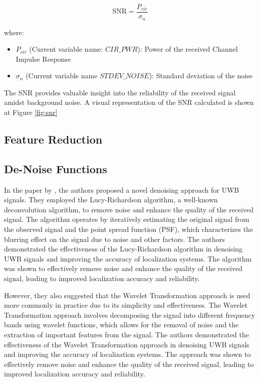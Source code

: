 \begin{equation}
  \text{SNR} = \frac{P_{cir}}{\sigma_n}
\end{equation}

where:

\begin{itemize}
  \item $P_{cir}$ (Current variable name: $CIR\_PWR$): Power of the received Channel Impulse Response
  \item $\sigma_n$ (Current variable name $STDEV\_NOISE$): Standard deviation of the noise
\end{itemize}

The SNR provides valuable insight into the reliability of the received signal amidst background noise. A visual representation of the SNR calculated is shown at Figure \ref{fig:snr}

\subsection{Feature Reduction}\label{feature_reduction}

\subsection{De-Noise Functions}\label{de_noise_Functions}

In the paper by \cite{jiang_uwb_2020}, the authors proposed a novel denoising approach for UWB signals. They employed the Lucy-Richardson algorithm, a well-known deconvolution algorithm, to remove noise and enhance the quality of the received signal. The algorithm operates by iteratively estimating the original signal from the observed signal and the point spread function (PSF), which characterizes the blurring effect on the signal due to noise and other factors. The authors demonstrated the effectiveness of the Lucy-Richardson algorithm in denoising UWB signals and improving the accuracy of localization systems. The algorithm was shown to effectively remove noise and enhance the quality of the received signal, leading to improved localization accuracy and reliability.

However, they also suggested that the Wavelet Transformation approach is used more commonly in practice due to its simplicity and effectiveness. The Wavelet Transformation approach involves decomposing the signal into different frequency bands using wavelet functions, which allows for the removal of noise and the extraction of important features from the signal. The authors demonstrated the effectiveness of the Wavelet Transformation approach in denoising UWB signals and improving the accuracy of localization systems. The approach was shown to effectively remove noise and enhance the quality of the received signal, leading to improved localization accuracy and reliability.


